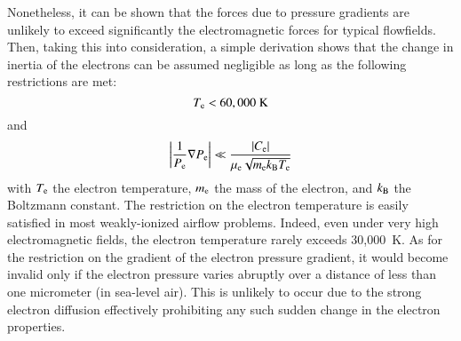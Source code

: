\documentclass{warpdoc}
\begin{document}
Nonetheless, it can be shown that the forces due to pressure gradients are unlikely to exceed significantly the electromagnetic forces for typical flowfields. Then, taking this into consideration, a simple derivation shows that the change in inertia of the electrons can be assumed negligible as long as the following restrictions are met: 
%
\begin{equation}
T_{\rm e} < 60,000 ~{\rm K}
\end{equation}   
%
and
%
\begin{equation}
\left| \frac{1}{P_{\rm e}} \nabla P_{\rm e}\right| \ll \frac{|C_{\rm e}|}{\mu_{\rm e} \sqrt{ m_{\rm e}  k_{\rm B} T_{\rm e}}} 
\end{equation}   
%
with $T_{\rm e}$ the electron temperature, $m_{\rm e}$ the mass of the electron, and $k_{\rm B}$ the Boltzmann constant. The restriction on the electron temperature is easily satisfied in most weakly-ionized airflow problems. Indeed, even under very high electromagnetic fields, the electron temperature rarely exceeds 30,000~K. As for the restriction on the gradient of the electron pressure gradient, it would become invalid only if the electron pressure varies abruptly over a distance of less than one micrometer (in sea-level air). This is unlikely to occur due to the strong electron diffusion effectively prohibiting any such sudden change in the electron properties.   
\end{document}
